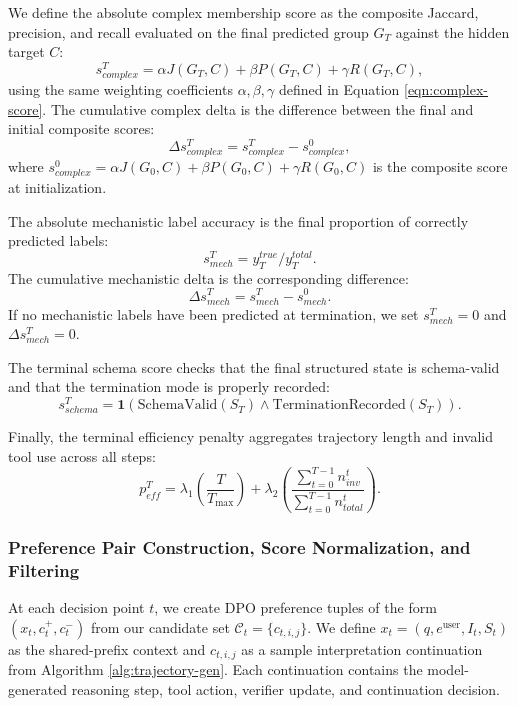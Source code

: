 \documentclass[thesis,letterpaper,12pt]{utthesis}
\begin{document}
We define the absolute complex membership score as the composite Jaccard, precision, and recall evaluated on the final predicted group $G_T$ against the hidden target $C$:
\begin{equation}\label{eqn:terminal-complex-abs}
    s^{T}_{complex} = \alpha J(G_T, C) + \beta P(G_T, C) + \gamma R(G_T, C),
\end{equation}
using the same weighting coefficients $\alpha, \beta, \gamma$ defined in Equation \ref{eqn:complex-score}. The cumulative complex delta is the difference between the final and initial composite scores:
\begin{equation}\label{eqn:terminal-complex-delta}
    \Delta s^{T}_{complex} = s^{T}_{complex} - s^{0}_{complex},
\end{equation}
where $s^{0}_{complex} = \alpha J(G_0, C) + \beta P(G_0, C) + \gamma R(G_0, C)$ is the composite score at initialization.

The absolute mechanistic label accuracy is the final proportion of correctly predicted labels:
\begin{equation}\label{eqn:terminal-mech-abs}
    s^{T}_{mech} = y^{true}_{T} / y^{total}_{T}.
\end{equation}
The cumulative mechanistic delta is the corresponding difference:
\begin{equation}\label{eqn:terminal-mech-delta}
    \Delta s^{T}_{mech} = s^{T}_{mech} - s^{0}_{mech}.
\end{equation}
If no mechanistic labels have been predicted at termination, we set $s^{T}_{mech} = 0$ and $\Delta s^{T}_{mech} = 0$.

The terminal schema score checks that the final structured state is schema-valid and that the termination mode is properly recorded:
\begin{equation}\label{eqn:terminal-schema}
    s^{T}_{schema} = \mathbf{1}(\text{SchemaValid}(S_T) \land \text{TerminationRecorded}(S_T)).
\end{equation}

Finally, the terminal efficiency penalty aggregates trajectory length and invalid tool use across all steps:
\begin{equation}\label{eqn:terminal-eff}
    p^{T}_{eff} = \lambda_1 \left(\frac{T}{T_{\max}}\right) + \lambda_2 \left(\frac{\sum_{t=0}^{T-1} n^{t}_{inv}}{\sum_{t=0}^{T-1} n^{t}_{total}}\right).
\end{equation}

\subsubsection{Preference Pair Construction, Score Normalization, and Filtering}\label{sec:pref-construction}
At each decision point $t$, we create DPO preference tuples of the form $(x_t, c_t^+, c_t^-)$ from our candidate set $\mathcal{C}_t = \{c_{t,i,j}\}$. We define $x_t = (q, e^{\text{user}}, I_t, S_t)$ as the shared-prefix context and $c_{t,i,j}$ as a sample interpretation continuation from Algorithm \ref{alg:trajectory-gen}. Each continuation contains the model-generated reasoning step, tool action, verifier update, and continuation decision.
\end{document}
